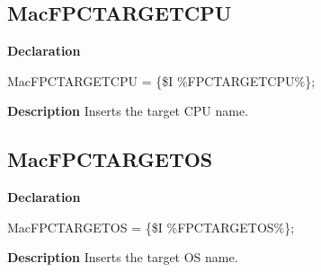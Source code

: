 \documentclass{report}
\begin{document}
\subsection*{MacFPCTARGETCPU}
\begin{list}{}{
\setlength{\itemindent}{0cm}
\setlength{\listparindent}{0cm}
\setlength{\leftmargin}{\evensidemargin}
\addtolength{\leftmargin}{\tmplength}
\settowidth{\labelsep}{X}
\addtolength{\leftmargin}{\labelsep}
\setlength{\labelwidth}{\tmplength}
}
\begin{flushleft}
\item[\textbf{Declaration}\hfill]
\begin{ttfamily}
MacFPCTARGETCPU = {\{}{\$}I {\%}FPCTARGETCPU{\%}{\}};\end{ttfamily}


\end{flushleft}
\par
\item[\textbf{Description}]
Inserts the target CPU name.

\end{list}
\subsection*{MacFPCTARGETOS}
\begin{list}{}{
\setlength{\itemindent}{0cm}
\setlength{\listparindent}{0cm}
\setlength{\leftmargin}{\evensidemargin}
\addtolength{\leftmargin}{\tmplength}
\settowidth{\labelsep}{X}
\addtolength{\leftmargin}{\labelsep}
\setlength{\labelwidth}{\tmplength}
}
\begin{flushleft}
\item[\textbf{Declaration}\hfill]
\begin{ttfamily}
MacFPCTARGETOS = {\{}{\$}I {\%}FPCTARGETOS{\%}{\}};\end{ttfamily}


\end{flushleft}
\par
\item[\textbf{Description}]
Inserts the target OS name.

\end{list}
\end{document}
